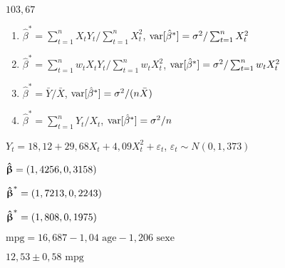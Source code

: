 \begin{reponse}{3.12}
    $103,67$
  
\end{reponse}
\begin{reponse}{3.15}
    \begin{enumerate}
    \item $\hat{\beta}^* = \sum_{t=1}^n X_t Y_t/\sum_{t=1}^n X_t^2$,
      $\mathrm{var} [ \hat{\beta}^* ] = \sigma^2/\sum_{t=1}^n X_t^2$
    \item $\hat{\beta}^* = \sum_{t=1}^n w_t X_t Y_t/\sum_{t=1}^n
      w_t X_t^2$,
      $\mathrm{var} [ \hat{\beta}^* ] = \sigma^2/\sum_{t=1}^n w_t X_t^2$
    \item $\hat{\beta}^* = \bar{Y}/\bar{X}$,
      $\mathrm{var} [ \hat{\beta}^* ] = \sigma^2/(n \bar{X})$
    \item $\hat{\beta}^* = \sum_{t=1}^n Y_t/X_t$,
      $\mathrm{var} [ \hat{\beta}^* ] = \sigma^2/n$
    \end{enumerate}
  
\end{reponse}
\begin{reponse}{3.16}
    $Y_t = 18,12 +
    29,68 X_t +
    4,09 X_t^2 + \varepsilon_t$,
    $\varepsilon_t \sim N(0, 1,373)$
  
\end{reponse}
\begin{reponse}{3.17}
    \begin{inparaenum}
    \item $\betabh = (%
      1,4256,
      0,3158)$
    \item $\betabh^* = (%
      1,7213,
      0,2243)$
    \item $\betabh^* = (%
      1,808,
      0,1975)$
    \end{inparaenum}
  
\end{reponse}
\begin{reponse}{3.18}
    \begin{inparaenum}
    \item $\text{mpg} = %
      16,687
      -1,04 \text{ age}
      -1,206 \text{ sexe}$
    \item $12,53 \pm
      0,58 \text{ mpg}$
    \end{inparaenum}
  
\end{reponse}
